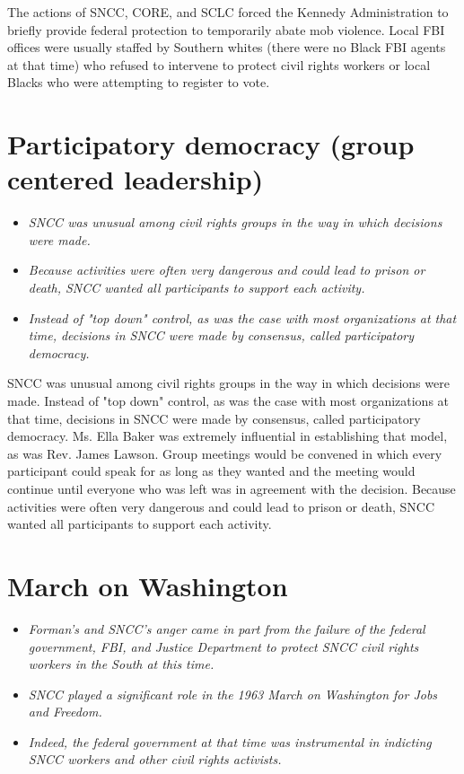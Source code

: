 The actions of SNCC, CORE, and SCLC forced the Kennedy Administration to
briefly provide federal protection to temporarily abate mob violence.
Local FBI offices were usually staffed by Southern whites (there were no
Black FBI agents at that time) who refused to intervene to protect civil
rights workers or local Blacks who were attempting to register to vote.

\section{Participatory democracy (group centered
leadership)}\label{participatory-democracy-group-centered-leadership}

\begin{itemize}
\item
  \emph{SNCC was unusual among civil rights groups in the way in which
  decisions were made.}
\item
  \emph{Because activities were often very dangerous and could lead to
  prison or death, SNCC wanted all participants to support each
  activity.}
\item
  \emph{Instead of "top down" control, as was the case with most
  organizations at that time, decisions in SNCC were made by consensus,
  called participatory democracy.}
\end{itemize}

SNCC was unusual among civil rights groups in the way in which decisions
were made. Instead of "top down" control, as was the case with most
organizations at that time, decisions in SNCC were made by consensus,
called participatory democracy. Ms. Ella Baker was extremely influential
in establishing that model, as was Rev. James Lawson. Group meetings
would be convened in which every participant could speak for as long as
they wanted and the meeting would continue until everyone who was left
was in agreement with the decision. Because activities were often very
dangerous and could lead to prison or death, SNCC wanted all
participants to support each activity.

\section{March on Washington}\label{march-on-washington}

\begin{itemize}
\item
  \emph{Forman's and SNCC's anger came in part from the failure of the
  federal government, FBI, and Justice Department to protect SNCC civil
  rights workers in the South at this time.}
\item
  \emph{SNCC played a significant role in the 1963 March on Washington
  for Jobs and Freedom.}
\item
  \emph{Indeed, the federal government at that time was instrumental in
  indicting SNCC workers and other civil rights activists.}
\end{itemize}

